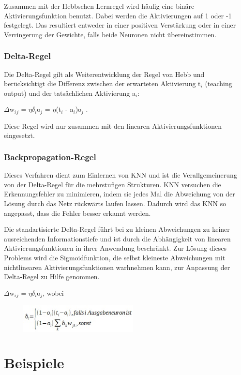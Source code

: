 Zusammen mit der Hebbschen Lernregel wird häufig eine binäre Aktivierungsfunktion benutzt. Dabei werden die Aktivierungen auf 1 oder -1 festgelegt. Das resultiert entweder in einer positiven Verstärkung oder in einer Verringerung der Gewichte, falls beide Neuronen nicht übereinstimmen.
\subsubsection{Delta-Regel}

Die Delta-Regel gilt als Weiterentwicklung der Regel von Hebb und berücksichtigt die Differenz zwischen der erwarteten Aktivierung t$_i$ (teaching output) und der tatsächlichen Aktivierung a$_i$:

$\Delta$w$_i$$_j$ = $\eta$$\delta$$_i$o$_j$ = $\eta$(t$_i$ - a$_i$)o$_j$ .

 Diese Regel wird nur zusammen mit den linearen Aktivierungsfunktionen eingesetzt.

\subsubsection{Backpropagation-Regel}

Dieses Verfahren dient zum Einlernen von KNN und ist die Verallgemeinerung von der Delta-Regel für die mehrstufigen Strukturen.
KNN versuchen die Erkennungsfehler zu minimieren, indem sie jedes Mal die Abweichung von der Lösung durch das Netz rückwärts laufen lassen. Dadurch wird das KNN so angepasst, dass die Fehler besser erkannt werden.

Die standartisierte Delta-Regel führt bei zu kleinen Abweichungen zu keiner ausreichenden Informationstiefe und ist durch die Abhängigkeit von linearen Aktivierungsfunktionen in ihrer Anwendung beschränkt. Zur Lösung dieses Problems wird die Sigmoidfunktion, die selbst kleineste Abweichungen mit nichtlinearen Aktivierungsfunktionen warhnehmen kann, zur Anpassung der Delta-Regel zu Hilfe genommen.

$\Delta$w$_i$$_j$ = $\eta$$\delta$$_i$o$_j$,
\newline
wobei
\begin{figure}[h]
\centering
\includegraphics[width=6cm]{chapters/neural_networks/delta.jpg}

\end{figure}
\section{Beispiele}
